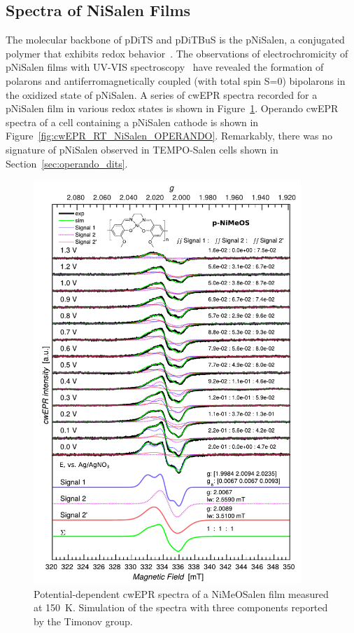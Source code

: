 \subsection{Spectra of NiSalen Films}
The molecular backbone of pDiTS and pDiTBuS is the pNiSalen, a conjugated polymer that exhibits redox behavior~\cite{Dmitrieva2018,Vereshchagin2020,Apraksin2021}. The observations of electrochromicity of pNiSalen films with UV-VIS spectroscopy~\cite{Dmitrieva2018} have revealed the formation of polarons and antiferromagnetically coupled (with total spin S=0) bipolarons in the oxidized state of pNiSalen. A series of cwEPR spectra recorded for a pNiSalen film in various redox states is shown in Figure~\ref{fig:cwEPR_CRYO_NiSalen_REDOX_SIM}. Operando cwEPR spectra of a cell containing a pNiSalen cathode is shown in Figure~\ref{fig:cwEPR_RT_NiSalen_OPERANDO}. Remarkably, there was no signature of pNiSalen observed in TEMPO-Salen cells shown in Section~\ref{sec:operando_dits}.

\begin{figure}[!h]
\center
	\includegraphics[width=0.9\textwidth]{./operando_epr/figures/CRYO/Figure_S8.pdf}
	\caption{Potential-dependent cwEPR spectra of a NiMeOSalen film measured at 150~K. Simulation of the spectra with three components reported by the Timonov group.}
	\label{fig:cwEPR_CRYO_NiSalen_REDOX_SIM}
\end{figure}

